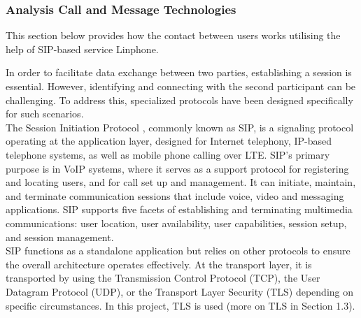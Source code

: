 \subsubsection{Analysis Call and Message Technologies}
\noindent This section below provides how the contact between users works utilising the help of SIP-based service Linphone.

    In order to facilitate data exchange between two parties, 
    establishing a session is essential. However, identifying and connecting with 
    the second participant can be challenging. To address this, specialized protocols 
    have been designed specifically for such scenarios. \\

    \noindent The Session Initiation Protocol \cite{sip}, 
    commonly known as SIP, is a signaling protocol operating at the 
    application layer, designed for Internet telephony, IP-based telephone systems, 
    as well as mobile phone calling over LTE. SIP’s primary purpose is in VoIP systems, where it serves 
    as a support protocol for registering and locating users, and for call set up and management. It can initiate, maintain, 
    and terminate communication sessions that include voice, video and messaging applications. SIP supports five facets of establishing and terminating multimedia communications: 
    user location, user availability, user capabilities, session setup, and session management. \\

    \noindent SIP functions as a standalone application but relies on other protocols 
    to ensure the overall architecture operates effectively. At the transport layer, 
    it is transported by using the Transmission Control Protocol (TCP), the User Datagram Protocol (UDP), 
    or the Transport Layer Security (TLS) depending on specific circumstances. In this project, 
    TLS is used (more on TLS in Section 1.3). \\

